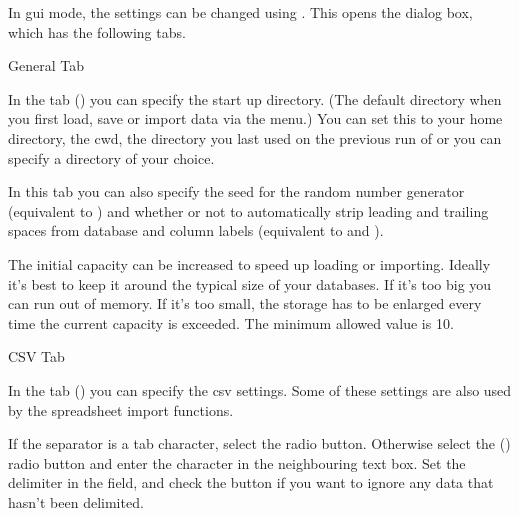In \gls{gui} mode, the settings can be changed using
. This opens the  dialog
box, which has the following tabs.


 {%
 }
 {General Tab}

In the  tab () you can specify the start up directory. (The default 
directory when you first load, save or import data via the 
 menu.) You can set this to your home directory,
the \gls{cwd}, the directory you last used on the previous run
of  or you can specify a directory of your choice.

In this tab you can also specify the seed for the random number generator 
(equivalent to ) and whether or not to automatically
strip leading and trailing spaces from database and column labels
(equivalent to  and 
).


     The initial capacity can be increased to speed up loading or importing.
     Ideally it's best to keep it around the typical size of your databases.
     If it's too big you can run out of memory. If it's too small, the storage
     has to be enlarged every time the current capacity is exceeded. The
     minimum allowed value is 10.


 {%
 }
 {CSV Tab}

In the  tab () you can specify the \gls{csv} settings. Some of
these settings are also used by the spreadsheet import functions.

If the separator is a tab character, select the 
 radio button. Otherwise
select the ()
 radio button
and enter the character in the neighbouring text box. Set the delimiter
in the  field, and
check the  button
if you want to ignore any data that hasn't been delimited.

